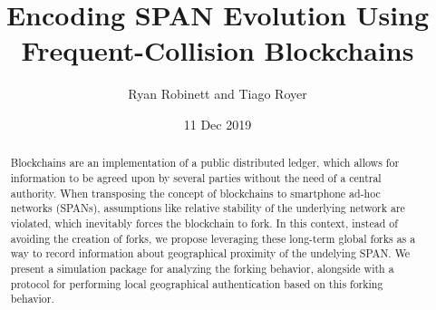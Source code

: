 \documentclass[twocolumn,10pt]{article}
\begin{document}
\title{Encoding SPAN Evolution Using Frequent-Collision Blockchains}
\author{Ryan Robinett and Tiago Royer}
\date{11 Dec 2019}
\maketitle

\begin{abstract}
	Blockchains are an implementation of a public distributed ledger,
	which allows for information to be agreed upon by several parties
	without the need of a central authority.
	When transposing the concept of blockchains to smartphone ad-hoc networks (SPANs),
	assumptions like relative stability of the underlying network are violated,
	which inevitably forces the blockchain to fork.
	In this context,
	instead of avoiding the creation of forks,
	we propose leveraging these long-term global forks
	as a way to record information about geographical proximity of the undelying SPAN.
	We present a simulation package for analyzing the forking behavior,
	alongside with a protocol for performing local geographical authentication
	based on this forking behavior.
\end{abstract}



















\end{document}
